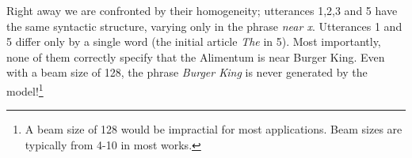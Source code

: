 \begin{enumerate}
%
\end{enumerate}
Right away we are confronted by their homogeneity; utterances 1,2,3 and 5
have the same syntactic structure, varying only in the phrase \textit{near x}.
Utterances 1 and 5 differ only by a single word (the initial article \textit{The} in 5).  Most importantly, none of them correctly specify that the Alimentum 
is near Burger King. Even with a beam size of 128, the phrase \textit{Burger King} is never generated by the model!\footnote{A beam size of 128 would be impractial for most applications. Beam sizes are typically from 4-10 in most works.}

